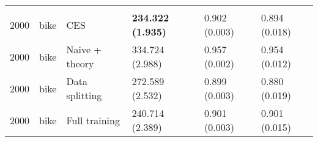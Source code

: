 \begin{tabular}{rlllll}
\addlinespace[0.3em]
\multicolumn{6}{l}{\textbf{2000}}\\
\hspace{1em}2000 & bike & CES & \textbf{234.322 (1.935)} & 0.902 (0.003) & 0.894 (0.018)\\
\hspace{1em}2000 & bike & Naive + theory & 334.724 (2.988) & 0.957 (0.002) & 0.954 (0.012)\\
\hspace{1em}2000 & bike & Data splitting & 272.589 (2.532) & 0.899 (0.003) & 0.880 (0.019)\\
\hspace{1em}2000 & bike & Full training & 240.714 (2.389) & 0.901 (0.003) & 0.901 (0.015)\\
\bottomrule
\end{tabular}

